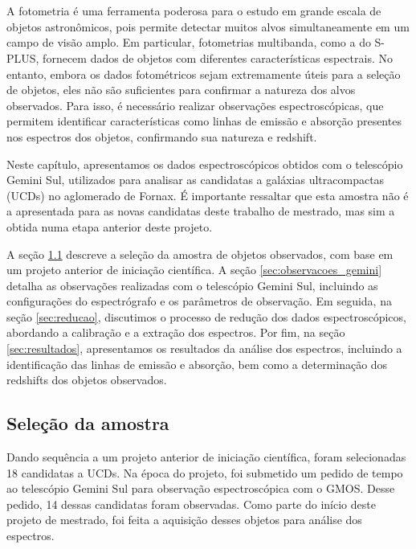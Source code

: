 \appendix
\chapter{\chapternameappendix}\label{chap:spectra}
A fotometria é uma ferramenta poderosa para o estudo em grande escala de objetos astronômicos, pois permite detectar muitos alvos simultaneamente em um campo de visão amplo. Em particular, fotometrias multibanda, como a do S-PLUS, fornecem dados de objetos com diferentes características espectrais. No entanto, embora os dados fotométricos sejam extremamente úteis para a seleção de objetos, eles não são suficientes para confirmar a natureza dos alvos observados. Para isso, é necessário realizar observações espectroscópicas, que permitem identificar características como linhas de emissão e absorção presentes nos espectros dos objetos, confirmando sua natureza e redshift.

Neste capítulo, apresentamos os dados espectroscópicos obtidos com o telescópio Gemini Sul, utilizados para analisar as candidatas a galáxias ultracompactas (UCDs) no aglomerado de Fornax. É importante ressaltar que esta amostra não é a apresentada para as novas candidatas deste trabalho de mestrado, mas sim a obtida numa etapa anterior deste projeto.

A seção \ref{sec:selecao_amostra} descreve a seleção da amostra de objetos observados, com base em um projeto anterior de iniciação científica. A seção \ref{sec:observacoes_gemini} detalha as observações realizadas com o telescópio Gemini Sul, incluindo as configurações do espectrógrafo e os parâmetros de observação. Em seguida, na seção \ref{sec:reducao}, discutimos o processo de redução dos dados espectroscópicos, abordando a calibração e a extração dos espectros. Por fim, na seção \ref{sec:resultados}, apresentamos os resultados da análise dos espectros, incluindo a identificação das linhas de emissão e absorção, bem como a determinação dos redshifts dos objetos observados.

\section{Seleção da amostra}\label{sec:selecao_amostra}
Dando sequência a um projeto anterior de iniciação científica, foram selecionadas 18 candidatas a UCDs. Na época do projeto, foi submetido um pedido de tempo ao telescópio Gemini Sul para observação espectroscópica com o GMOS. Desse pedido, 14 dessas candidatas foram observadas. Como parte do início deste projeto de mestrado, foi feita a aquisição desses objetos para análise dos espectros.


